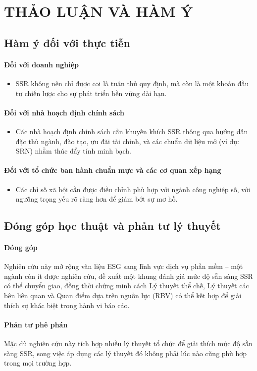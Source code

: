 \chapter{THẢO LUẬN VÀ HÀM Ý}

\section{Hàm ý đối với thực tiễn}

\subsubsection{Đối với doanh nghiệp}
\begin{itemize}
\item SSR không nên chỉ được coi là tuân thủ quy định, mà còn là một khoản đầu tư chiến lược cho sự phát triển bền vững dài hạn.
\end{itemize}

\subsubsection{Đối với nhà hoạch định chính sách}
\begin{itemize}
\item Các nhà hoạch định chính sách cần khuyến khích SSR thông qua hướng dẫn đặc thù ngành, đào tạo, ưu đãi tài chính, và các chuẩn dữ liệu mở (ví dụ: SRN) nhằm thúc đẩy tính minh bạch.
\end{itemize}

\subsubsection{Đối với tổ chức ban hành chuẩn mực và các cơ quan xếp hạng}
\begin{itemize}
\item Các chỉ số xã hội cần được điều chỉnh phù hợp với ngành công nghiệp số, với ngưỡng trọng yếu rõ ràng hơn để giảm bớt sự mơ hồ.
\end{itemize}

\section{Đóng góp học thuật và phản tư lý thuyết}

\subsubsection{Đóng góp}
Nghiên cứu này mở rộng văn liệu ESG sang lĩnh vực dịch vụ phần mềm – một ngành còn ít được nghiên cứu, đề xuất một khung đánh giá mức độ sẵn sàng SSR có thể chuyển giao, đồng thời chứng minh cách Lý thuyết thể chế, Lý thuyết các bên liên quan và Quan điểm dựa trên nguồn lực (RBV) có thể kết hợp để giải thích sự khác biệt trong hành vi báo cáo.

\subsubsection{Phản tư phê phán}
Mặc dù nghiên cứu này tích hợp nhiều lý thuyết tổ chức để giải thích mức độ sẵn sàng SSR, song việc áp dụng các lý thuyết đó không phải lúc nào cũng phù hợp trong mọi trường hợp.